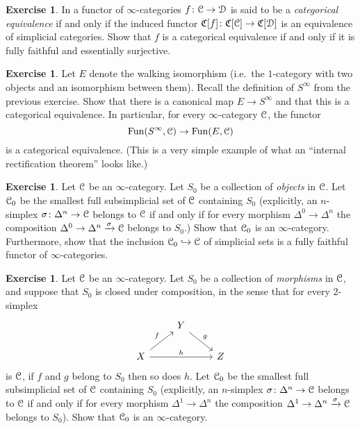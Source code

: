 \documentclass[10pt,a4paper,reqno,oneside]{book} %
\theoremstyle{plain}
\theoremstyle{definition}
\newtheorem{exercise}[thm]{Exercise}
\theoremstyle{remark}
\numberwithin{equation}{section}
\begin{document}
\begin{exercise}
	In \cite{HTT} a functor of $\infty$-categories $f \colon \mathcal C \to \mathcal D$ is said to be a \emph{categorical equivalence} if and only if the induced functor $\mathfrak C[f] \colon \mathfrak C[\mathcal C] \to \mathfrak C[\mathcal D]$ is an equivalence of simplicial categories.
	Show that $f$ is a categorical equivalence if and only if it is fully faithful and essentially surjective.
\end{exercise}

\begin{exercise}
	Let $E$ denote the walking isomorphism (i.e.\ the $1$-category with two objects and an isomorphism between them).
	Recall the definition of $S^\infty$ from the previous exercise.
	Show that there is a canonical map $E \to S^\infty$ and that this is a categorical equivalence.
	In particular, for every $\infty$-category $\mathcal C$, the functor
	\[ \operatorname{Fun}(S^\infty, \mathcal C) \to \operatorname{Fun}(E, \mathcal C) \]
	is a categorical equivalence.
	(This is a very simple example of what an ``internal rectification theorem'' looks like.)
\end{exercise}

\begin{exercise}
	Let $\mathcal C$ be an $\infty$-category.
	Let $S_0$ be a collection of \emph{objects} in $\mathcal C$.
	Let $\mathcal C_0$ be the smallest full subsimplicial set of $\mathcal C$ containing $S_0$ (explicitly, an $n$-simplex $\sigma \colon \Delta^n \to \mathcal C$ belongs to $\mathcal C$ if and only if for every morphism $\Delta^0 \to \Delta^n$ the composition $\Delta^0 \to \Delta^n \xrightarrow{\sigma} \mathcal C$ belongs to $S_0$.)
	Show that $\mathcal C_0$ is an $\infty$-category.
	Furthermore, show that the inclusion $\mathcal C_0 \hookrightarrow \mathcal C$ of simplicial sets is a fully faithful functor of $\infty$-categories.
\end{exercise}

\begin{exercise}
	Let $\mathcal C$ be an $\infty$-category.
	Let $S_0$ be a collection of \emph{morphisms} in $\mathcal C$, and suppose that $S_0$ is closed under composition, in the sense that for every $2$-simplex
	\[ \begin{tikzcd}
	{} & Y \arrow{dr}{g} \\
	X \arrow{ur}{f} \arrow{rr}{h} & & Z
	\end{tikzcd} \]
	is $\mathcal C$, if $f$ and $g$ belong to $S_0$ then so does $h$.
	Let $\mathcal C_0$ be the smallest full subsimplicial set of $\mathcal C$ containing $S_0$ (explicitly, an $n$-simplex $\sigma \colon \Delta^n \to \mathcal C$ belongs to $\mathcal C$ if and only if for every morphism $\Delta^1 \to \Delta^n$ the composition $\Delta^1 \to \Delta^n \xrightarrow{\sigma} \mathcal C$ belongs to $S_0$).
	Show that $\mathcal C_0$ is an $\infty$-category.
\end{exercise}
\end{document}

